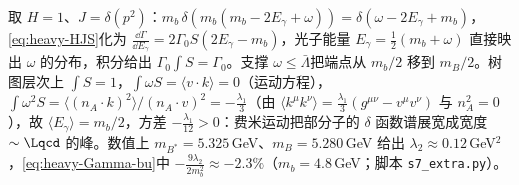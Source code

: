 \begin{example}[端点区的树图检验]\label{ex:heavy-photon}
取 $H=1$、$J=\delta(p^2)$：$m_b\,\delta(m_b(m_b-2E_\gamma+\omega))=\delta(\omega-2E_\gamma+m_b)$，\cref{eq:heavy-HJS}化为 $\frac{\dd\Gamma}{\dd E_\gamma}=2\Gamma_0S(2E_\gamma-m_b)$，光子能量 $E_\gamma=\frac12(m_b+\omega)$ 直接映出 $\omega$ 的分布，积分给出 $\Gamma_0\int S=\Gamma_0$。支撑 $\omega\le\bar\Lambda$\cite{Neubert1994b}把端点从 $m_b/2$ 移到 $m_B/2$。树图层次上 $\int S=1$，$\int\omega S=\langle v\cdot k\rangle=0$（运动方程），$\int\omega^2S=\langle(n_A\cdot k)^2\rangle/(n_A\cdot v)^2=-\frac{\lambda_1}{3}$（由 $\langle k^\mu k^\nu\rangle=\frac{\lambda_1}{3}(g^{\mu\nu}-v^\mu v^\nu)$ 与 $n_A^2=0$），故 $\langle E_\gamma\rangle=m_b/2$，方差 $-\frac{\lambda_1}{12}>0$：费米运动把部分子的 $\delta$ 函数谱展宽成宽度 $\sim\Lqcd$ 的峰。数值上 $m_{B^*}=5.325$\,GeV、$m_B=5.280$\,GeV 给出 $\lambda_2\approx0.12$\,GeV$^2$，\cref{eq:heavy-Gamma-bu}中 $-\frac{9\lambda_2}{2m_b^2}\approx-2.3\%$（$m_b=4.8$\,GeV；脚本 \texttt{s7\_\allowbreak extra.py}）。
\end{example}

